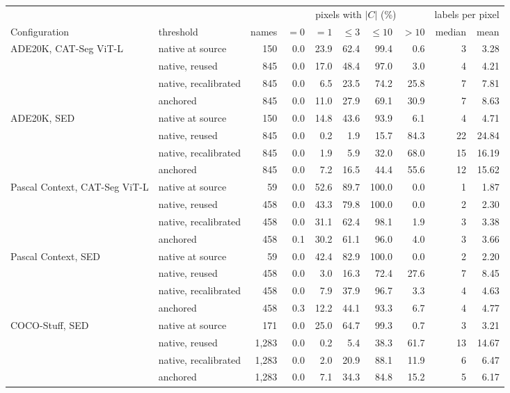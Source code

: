 \begin{tabular}{@{}llrrrrrrrr@{}}
\toprule
& & & \multicolumn{5}{c}{pixels with $|C|$ (\%)} & \multicolumn{2}{c}{labels per pixel} \\
\cmidrule(lr){4-8}\cmidrule(l){9-10}
Configuration & threshold & names & $=0$ & $=1$ & $\le 3$ & $\le 10$ & $>10$ & median & mean \\
\midrule
ADE20K, CAT-Seg ViT-L & native at source & 150 & 0.0 & 23.9 & 62.4 & 99.4 & 0.6 & 3 & 3.28 \\
 & native, reused & 845 & 0.0 & 17.0 & 48.4 & 97.0 & 3.0 & 4 & 4.21 \\
 & native, recalibrated & 845 & 0.0 & 6.5 & 23.5 & 74.2 & 25.8 & 7 & 7.81 \\
 & anchored & 845 & 0.0 & 11.0 & 27.9 & 69.1 & 30.9 & 7 & 8.63 \\
\addlinespace
ADE20K, SED & native at source & 150 & 0.0 & 14.8 & 43.6 & 93.9 & 6.1 & 4 & 4.71 \\
 & native, reused & 845 & 0.0 & 0.2 & 1.9 & 15.7 & 84.3 & 22 & 24.84 \\
 & native, recalibrated & 845 & 0.0 & 1.9 & 5.9 & 32.0 & 68.0 & 15 & 16.19 \\
 & anchored & 845 & 0.0 & 7.2 & 16.5 & 44.4 & 55.6 & 12 & 15.62 \\
\addlinespace
Pascal Context, CAT-Seg ViT-L & native at source & 59 & 0.0 & 52.6 & 89.7 & 100.0 & 0.0 & 1 & 1.87 \\
 & native, reused & 458 & 0.0 & 43.3 & 79.8 & 100.0 & 0.0 & 2 & 2.30 \\
 & native, recalibrated & 458 & 0.0 & 31.1 & 62.4 & 98.1 & 1.9 & 3 & 3.38 \\
 & anchored & 458 & 0.1 & 30.2 & 61.1 & 96.0 & 4.0 & 3 & 3.66 \\
\addlinespace
Pascal Context, SED & native at source & 59 & 0.0 & 42.4 & 82.9 & 100.0 & 0.0 & 2 & 2.20 \\
 & native, reused & 458 & 0.0 & 3.0 & 16.3 & 72.4 & 27.6 & 7 & 8.45 \\
 & native, recalibrated & 458 & 0.0 & 7.9 & 37.9 & 96.7 & 3.3 & 4 & 4.63 \\
 & anchored & 458 & 0.3 & 12.2 & 44.1 & 93.3 & 6.7 & 4 & 4.77 \\
\addlinespace
COCO-Stuff, SED & native at source & 171 & 0.0 & 25.0 & 64.7 & 99.3 & 0.7 & 3 & 3.21 \\
 & native, reused & 1,283 & 0.0 & 0.2 & 5.4 & 38.3 & 61.7 & 13 & 14.67 \\
 & native, recalibrated & 1,283 & 0.0 & 2.0 & 20.9 & 88.1 & 11.9 & 6 & 6.47 \\
 & anchored & 1,283 & 0.0 & 7.1 & 34.3 & 84.8 & 15.2 & 5 & 6.17 \\
\bottomrule
\end{tabular}
